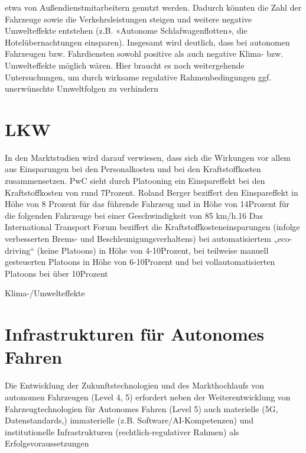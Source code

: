 etwa von Außendienstmitarbeitern genutzt werden. Dadurch könnten die
Zahl der Fahrzeuge sowie die Verkehrsleistungen steigen und weitere negative
Umwelteffekte entstehen (z.B. «Autonome Schlafwagenflotten», die Hotelübernachtungen einsparen).
Insgesamt wird deutlich, dass bei autonomen Fahrzeugen bzw. Fahrdiensten
sowohl positive als auch negative Klima- bzw. Umwelteffekte möglich wären. Hier
braucht es noch weitergehende Untersuchungen, um durch wirksame regulative
Rahmenbedingungen ggf. unerwünschte Umweltfolgen zu verhindern



































\section{LKW}
In den Marktstudien wird darauf verwiesen, dass sich die Wirkungen vor
allem aus Einsparungen bei den Personalkosten und bei den Kraftstoffkosten
zusammensetzen. PwC sieht durch Platooning ein Einspareffekt bei den
Kraftstoffkosten von rund 7Prozent. Roland Berger beziffert den Einspareffekt in
Höhe von 8 Prozent für das führende Fahrzeug und in Höhe von 14Prozent für die
folgenden Fahrzeuge bei einer Geschwindigkeit von 85 km/h.16 Das
International Transport Forum beziffert die Kraftstoffkosteneinsparungen
(infolge verbesserten Brems- und Beschleunigungsverhaltens) bei
automatisiertem „eco-driving“ (keine Platoons) in Höhe von 4-10Prozent, bei
teilweise manuell gesteuerten Platoons in Höhe von 6-10Prozent und bei
vollautomatisierten Platoons bei über 10Prozent



Klima-/Umwelteffekte



\section{Infrastrukturen für Autonomes Fahren}
Die Entwicklung der Zukunftstechnologien und des Markthochlaufs von autonomen Fahrzeugen (Level 4, 5) erfordert neben der Weiterentwicklung von Fahrzeugtechnologien für Autonomes Fahren (Level 5) auch materielle (5G, Datenstandards,)
immaterielle (z.B. Software/AI-Kompetenzen) und institutionelle Infrastrukturen
(rechtlich-regulativer Rahmen) als Erfolgsvoraussetzungen
